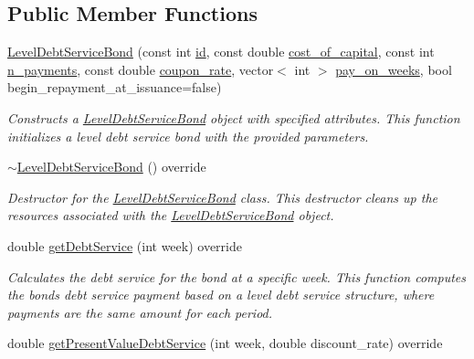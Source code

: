 \subsection*{Public Member Functions}
\begin{DoxyCompactItemize}
\item 
\mbox{\hyperlink{classLevelDebtServiceBond_a71af87d057090bd2310a10df03b36fdf}{Level\+Debt\+Service\+Bond}} (const int \mbox{\hyperlink{classBond_a7f75bcafbc16676ad6dbafbf40afae4a}{id}}, const double \mbox{\hyperlink{classBond_ad98df7d28b398e620286f95ee085439b}{cost\+\_\+of\+\_\+capital}}, const int \mbox{\hyperlink{classBond_a4a227b6de2eeada118d82ab1633b1db8}{n\+\_\+payments}}, const double \mbox{\hyperlink{classBond_a5f66785534e24caa43d9f730130a6463}{coupon\+\_\+rate}}, vector$<$ int $>$ \mbox{\hyperlink{classBond_ae8dd46fcbf95c993460ffe4ea1f52739}{pay\+\_\+on\+\_\+weeks}}, bool begin\+\_\+repayment\+\_\+at\+\_\+issuance=false)
\begin{DoxyCompactList}\small\item\em Constructs a \mbox{\hyperlink{classLevelDebtServiceBond}{Level\+Debt\+Service\+Bond}} object with specified attributes. This function initializes a level debt service bond with the provided parameters. \end{DoxyCompactList}\item 
\mbox{\hyperlink{classLevelDebtServiceBond_a6327829c1f1e6941cc22cea371cf024a}{$\sim$\+Level\+Debt\+Service\+Bond}} () override
\begin{DoxyCompactList}\small\item\em Destructor for the \mbox{\hyperlink{classLevelDebtServiceBond}{Level\+Debt\+Service\+Bond}} class. This destructor cleans up the resources associated with the \mbox{\hyperlink{classLevelDebtServiceBond}{Level\+Debt\+Service\+Bond}} object. \end{DoxyCompactList}\item 
double \mbox{\hyperlink{classLevelDebtServiceBond_adcb3bd3c34b0cbb7b013f387ddd8b7f5}{get\+Debt\+Service}} (int week) override
\begin{DoxyCompactList}\small\item\em Calculates the debt service for the bond at a specific week. This function computes the bond\textquotesingle{}s debt service payment based on a level debt service structure, where payments are the same amount for each period. \end{DoxyCompactList}\item 
double \mbox{\hyperlink{classLevelDebtServiceBond_a37801ecfc13ae1b6e05b4330398a7582}{get\+Present\+Value\+Debt\+Service}} (int week, double discount\+\_\+rate) override

\end{DoxyCompactItemize}
